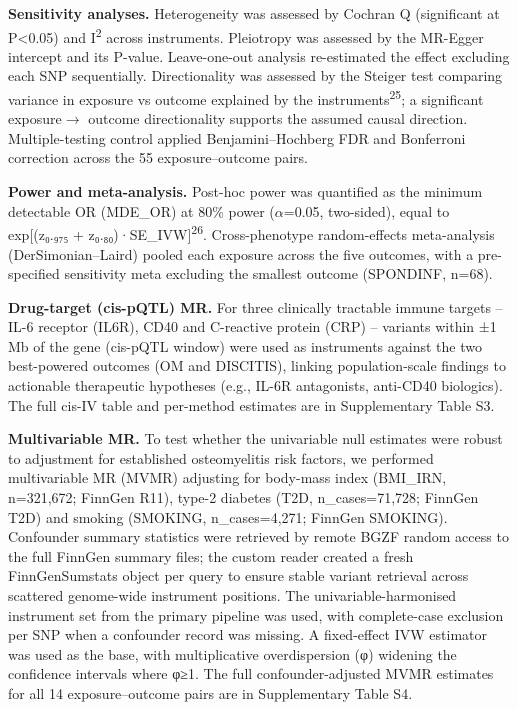 \documentclass[11pt]{article}
\begin{document}
\textbf{Sensitivity analyses.} Heterogeneity was assessed by Cochran Q (significant at P<0.05) and I\textsuperscript{2} across instruments. Pleiotropy was assessed by the MR-Egger intercept and its P-value. Leave-one-out analysis re-estimated the effect excluding each SNP sequentially. Directionality was assessed by the Steiger test comparing variance in exposure vs outcome explained by the instruments\textsuperscript{25}; a significant exposure$\rightarrow$ outcome directionality supports the assumed causal direction. Multiple-testing control applied Benjamini--Hochberg FDR and Bonferroni correction across the 55 exposure--outcome pairs.

\textbf{Power and meta-analysis.} Post-hoc power was quantified as the minimum detectable OR (MDE\_OR) at 80\% power ($\alpha$=0.05, two-sided), equal to exp[(z₀.₉₇₅ + z₀.₈₀)·SE\_IVW]\textsuperscript{26}. Cross-phenotype random-effects meta-analysis (DerSimonian--Laird) pooled each exposure across the five outcomes, with a pre-specified sensitivity meta excluding the smallest outcome (SPONDINF, n=68).

\textbf{Drug-target (cis-pQTL) MR.} For three clinically tractable immune targets -- IL-6 receptor (IL6R), CD40 and C-reactive protein (CRP) -- variants within ±1 Mb of the gene (cis-pQTL window) were used as instruments against the two best-powered outcomes (OM and DISCITIS), linking population-scale findings to actionable therapeutic hypotheses (e.g., IL-6R antagonists, anti-CD40 biologics). The full cis-IV table and per-method estimates are in Supplementary Table S3.

\textbf{Multivariable MR.} To test whether the univariable null estimates were robust to adjustment for established osteomyelitis risk factors, we performed multivariable MR (MVMR) adjusting for body-mass index (BMI\_IRN, n=321,672; FinnGen R11), type-2 diabetes (T2D, n\_cases=71,728; FinnGen T2D) and smoking (SMOKING, n\_cases=4,271; FinnGen SMOKING). Confounder summary statistics were retrieved by remote BGZF random access to the full FinnGen summary files; the custom reader created a fresh FinnGenSumstats object per query to ensure stable variant retrieval across scattered genome-wide instrument positions. The univariable-harmonised instrument set from the primary pipeline was used, with complete-case exclusion per SNP when a confounder record was missing. A fixed-effect IVW estimator was used as the base, with multiplicative overdispersion (φ) widening the confidence intervals where φ≥1. The full confounder-adjusted MVMR estimates for all 14 exposure--outcome pairs are in Supplementary Table S4.
\end{document}
